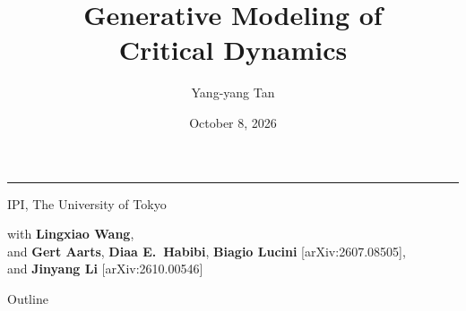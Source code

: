 \documentclass[11pt,t]{beamer}
\title{Generative Modeling of\\ Critical Dynamics}
\subtitle{}
\date{October 8, 2026}
\author{Yang-yang Tan}
\begin{document}
\begin{frame}
  \inserttitlegraphic\par
  \vspace*{0.5cm}
  {\LARGE\bfseries \inserttitle\par}
  \vspace{0.4em}
  {\color{orange}\rule{\textwidth}{0.4pt}\par}
  \vspace{1.4em}
  {\normalsize\bfseries \insertauthor\par}
  \vspace{0.6em}
  {\small IPI, The University of Tokyo\par}
  \vspace{0.4em}
  {\small with \textbf{Lingxiao Wang},\\
  and \textbf{Gert Aarts}, \textbf{Diaa E.\ Habibi}, \textbf{Biagio Lucini} [arXiv:2607.08505],\\
  and \textbf{Jinyang Li} [arXiv:2610.00546]\par}
  \vspace{0.3em}
  {\normalsize \insertdate\par}
\end{frame}

\begin{frame}{Outline}
  \tableofcontents
\end{frame}

\end{document}
